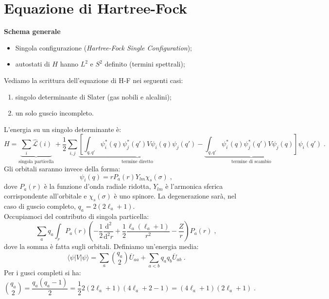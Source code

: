\documentclass[12pt,a4paper]{report}
\theoremstyle{definition}
\newcommand{\lag}{\mathcal{L}}
\numberwithin{equation}{section}
\newcommand{\diff}[1][]{\mathrm{d}#1}
\newcommand{\bra}{\langle}
\newcommand{\ket}{\rangle}
\begin{document}
\section{Equazione di Hartree-Fock}
\textbf{Schema generale}
\begin{itemize}
\item Singola configurazione (\emph{Hartree-Fock Single Configuration});
\item autostati di $H$ hanno $L^2$ e $S^2$ definito (termini spettrali);
\end{itemize}
Vediamo la scrittura dell'equazione di H-F nei seguenti casi:
\begin{enumerate}
\item singolo determinante di Slater (gas nobili e alcalini);
\item un solo guscio incompleto.
\end{enumerate}
L'energia su un singolo determinante è:
\begin{equation}
H=\underbrace{\sum_i \hat{\lag}(i)}_{\mbox{singola particella}}+\frac{1}{2}\sum_{i,j}\underbrace{\left[\int_{q,q'}\psi_i^*(q)\psi_j^*(q')V\psi_i(q)\psi_j(q')\right.}_{\mbox{termine diretto}}-\underbrace{\left.\int_{q,q'}\psi_i^*(q)\psi_j^*(q')V\psi_j(q)\right]}_{\mbox{termine di scambio}}\psi_i(q')\;.
\end{equation}
Gli orbitali saranno invece della forma:
\begin{equation}
\psi_i(q)=rP_a(r)Y_{lm}\chi_s(\sigma)\;,
\end{equation}
dove $P_a(r)$ è la funzione d'onda radiale ridotta, $Y_{lm}$ è l'armonica sferica corrispondente all'orbitale e $\chi_s(\sigma)$ è uno spinore. La degenerazione sarà, nel caso di guscio completo, $q_a=2(2\ell_a+1)$. \\
Occupiamoci del contributo di singola particella:
\begin{equation}
\sum_a q_a\int_r P_a(r)\left(-\frac{1}{2}\frac{\diff^2}{\diff^2{r}}+\frac{1}{2}\frac{\ell_a(\ell_a+1)}{r^2}-\frac{Z}{r}\right)P_a(r)\;,
\end{equation}
dove la somma è fatta sugli orbitali. Definiamo un'energia media:
\begin{equation}
\bra\psi|V|\psi\ket=\sum_a \binom{q_a}{2}\overline{U}_{aa}+\sum_{a<b}q_aq_b\overline{U}_{ab}\;.
\end{equation}
Per i gusci completi si ha:
\begin{equation}
\binom{q_a}{2}=\frac{q_a(q_a-1)}{2}=\frac{1}{2}2(2\ell_a+1)(4\ell_a+2-1)=(4\ell_a+1)(2\ell_a+1)\;.
\end{equation}
\end{document}
